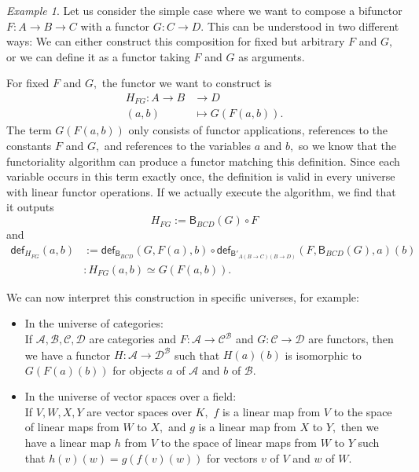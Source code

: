 \documentclass[a4paper]{article}
\theoremstyle{definition}
\theoremstyle{remark}
\newtheorem*{example}{Example}
\renewcommand{\equiv}{\simeq}
\newcommand{\A}{\mathcal{A}}
\newcommand{\B}{\mathcal{B}}
\newcommand{\C}{\mathcal{C}}
\newcommand{\D}{\mathcal{D}}
\newcommand{\nm}{\mathsf}
\newcommand{\fndef}[1]{\nm{def}_{#1}}
\newcommand{\combinator}{\nm}
\newcommand{\compFun}{\combinator{B'}}
\newcommand{\revCompFun}{\combinator{B}}
\begin{document}
\begin{example}
  Let us consider the simple case where we want to compose a bifunctor
  $F : A \to B \to C$ with a functor $G : C \to D.$ This can be understood in
  two different ways: We can either construct this composition for fixed but
  arbitrary $F$ and $G,$ or we can define it as a functor taking $F$ and $G$ as
  arguments.
  
  For fixed $F$ and $G,$ the functor we want to construct is
  \begin{align*}
    H_{FG} : A \to B &\to     D\\
             (a,b)   &\mapsto G(F(a,b)).
  \end{align*}
  The term $G(F(a,b))$ only consists of functor applications, references to the
  constants $F$ and $G,$ and references to the variables $a$ and $b,$ so we
  know that the functoriality algorithm can produce a functor matching this
  definition. Since each variable occurs in this term exactly once, the
  definition is valid in every universe with linear functor operations. If we
  actually execute the algorithm, we find that it outputs
  \[H_{FG} := \revCompFun_{BCD}(G) \circ F\]
  and
  \begin{align*}
    \fndef{H_{FG}}(a,b) &:= \fndef{\revCompFun_{BCD}}(G,F(a),b) \circ \fndef{\compFun_{A(B{\to}C)(B{\to}D)}}(F,\revCompFun_{BCD}(G),a)(b)\\
                        &: H_{FG}(a,b) \equiv G(F(a,b)).
  \end{align*}

  We can now interpret this construction in specific universes, for example:
  \begin{itemize}
    \item In the universe of categories:\\
    If $\A,\B,\C,\D$ are categories and $F : \A \to \C^\B$ and $G : \C \to \D$
    are functors, then we have a functor $H : \A \to \D^\B$ such that
    $H(a)(b)$ is isomorphic to $G(F(a)(b))$ for objects $a$ of $\A$ and $b$ of
    $\B.$
    \item In the universe of vector spaces over a field:\\
    If $V,W,X,Y$ are vector spaces over $K,$ $f$ is a linear map from $V$
    to the space of linear maps from $W$ to $X,$ and $g$ is a linear map
    from $X$ to $Y,$ then we have a linear map $h$ from $V$ to the space of
    linear maps from $W$ to $Y$ such that $h(v)(w) = g(f(v)(w))$ for vectors
    $v$ of $V$ and $w$ of $W.$
  \end{itemize}


\end{example}
\end{document}
